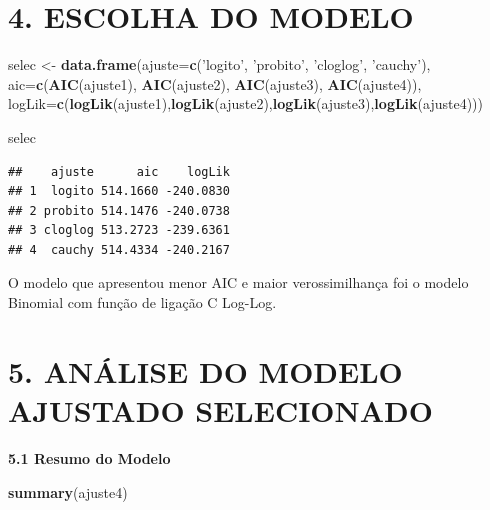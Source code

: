 \documentclass[]{article}
\newenvironment{Shaded}{\begin{snugshade}}{\end{snugshade}}
\newcommand{\KeywordTok}[1]{\textcolor[rgb]{0.13,0.29,0.53}{\textbf{{#1}}}}
\newcommand{\DataTypeTok}[1]{\textcolor[rgb]{0.13,0.29,0.53}{{#1}}}
\newcommand{\StringTok}[1]{\textcolor[rgb]{0.31,0.60,0.02}{{#1}}}
\newcommand{\NormalTok}[1]{{#1}}
\begin{document}
\section{4. ESCOLHA DO MODELO}\label{escolha-do-modelo}

\begin{Shaded}
\begin{Highlighting}[]
\NormalTok{selec <-}\StringTok{ }\KeywordTok{data.frame}\NormalTok{(}\DataTypeTok{ajuste=}\KeywordTok{c}\NormalTok{(}\StringTok{'logito'}\NormalTok{, }\StringTok{'probito'}\NormalTok{, }\StringTok{'cloglog'}\NormalTok{, }\StringTok{'cauchy'}\NormalTok{),}
                    \DataTypeTok{aic=}\KeywordTok{c}\NormalTok{(}\KeywordTok{AIC}\NormalTok{(ajuste1), }\KeywordTok{AIC}\NormalTok{(ajuste2), }\KeywordTok{AIC}\NormalTok{(ajuste3), }\KeywordTok{AIC}\NormalTok{(ajuste4)),}
                    \DataTypeTok{logLik=}\KeywordTok{c}\NormalTok{(}\KeywordTok{logLik}\NormalTok{(ajuste1),}\KeywordTok{logLik}\NormalTok{(ajuste2),}\KeywordTok{logLik}\NormalTok{(ajuste3),}\KeywordTok{logLik}\NormalTok{(ajuste4)))}

\NormalTok{selec}
\end{Highlighting}
\end{Shaded}

\begin{verbatim}
##    ajuste      aic    logLik
## 1  logito 514.1660 -240.0830
## 2 probito 514.1476 -240.0738
## 3 cloglog 513.2723 -239.6361
## 4  cauchy 514.4334 -240.2167
\end{verbatim}

O modelo que apresentou menor AIC e maior verossimilhança foi o modelo
Binomial com função de ligação C Log-Log.

\section{5. ANÁLISE DO MODELO AJUSTADO
SELECIONADO}\label{analise-do-modelo-ajustado-selecionado}

\textbf{5.1 Resumo do Modelo}

\begin{Shaded}
\begin{Highlighting}[]
\KeywordTok{summary}\NormalTok{(ajuste4)}
\end{Highlighting}
\end{Shaded}
\end{document}
